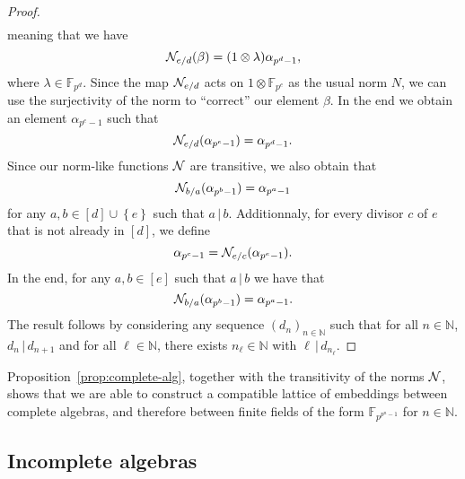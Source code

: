 \documentclass{sig-alternate}
\begin{document}
\begin{proof}
\begin{align*}
\end{align*}
meaning that we have
\[
  \mathcal{N}_{e/d}(\beta)=(1\otimes\lambda)\alpha_{p^{d}-1},
\]
where $\lambda\in\mathbb{F}_{p^d}$. Since the map
$\mathcal{N}_{e/d}$ acts on $1\otimes\mathbb{F}_{p^{e}}$ as the
usual norm $N$, we can use
the surjectivity of the norm to ``correct'' our element $\beta$. In the end we
obtain an element $\alpha_{p^{e}-1}$ such
that
\[
  \mathcal{N}_{e/d}(\alpha_{p^{e}-1}) = \alpha_{p^{d}-1}.
\]
Since our norm-like functions $\mathcal{N}$ are transitive, we also obtain that
\[
  \mathcal{N}_{b/a}(\alpha_{p^b-1})=\alpha_{p^a-1}
\]
for any $a,b\in \left[ d \right]\cup\left\{ e \right\}$ such that
$a\,|\,b$. Additionnaly, for every divisor $c$ of $e$ that is not already in $\left[
d \right]$, we define
\[
  \alpha_{p^c-1}=\mathcal{N}_{e/c}(\alpha_{p^{e}-1}).
\]
In the end, for any $a, b\in\left[ e \right]$ such that
$a\,|\,b$ we have that
\[
  \mathcal{N}_{b/a}(\alpha_{p^b-1})=\alpha_{p^a-1}.
\]
The result follows by considering any sequence $(d_n)_{n\in\mathbb{N}}$ such
that for all $n\in\mathbb{N}$, $d_n\,|\,d_{n+1}$ and for all
$\ell\in\mathbb{N}$, there exists $n_\ell\in\mathbb{N}$ with
$\ell\,|\,d_{n_\ell}$.
\end{proof}

Proposition~\ref{prop:complete-alg}, together with the transitivity of the
norms $\mathcal{N}$,
shows that we are able to construct a compatible lattice of embeddings between
complete algebras, and therefore between finite fields of the form
$\mathbb{F}_{p^{p^n-1}}$ for $n\in\mathbb{N}$.

\subsection{Incomplete algebras}
\end{document}
